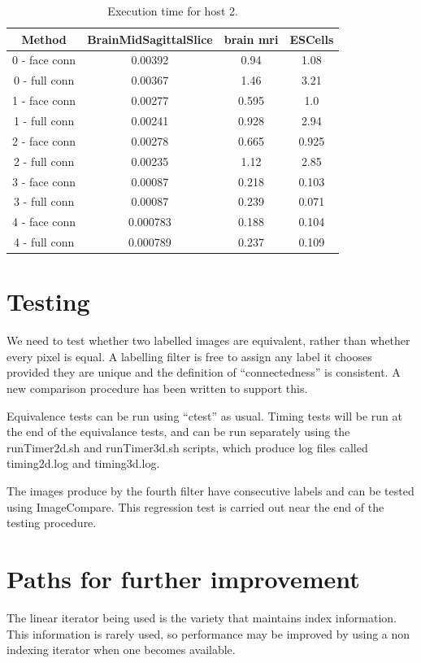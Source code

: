 \documentclass{InsightArticle}
\begin{document}
\begin{table}[htbp]
\centering
\begin{tabular}{|c|c|c|c|}
\hline
Method & BrainMidSagittalSlice & brain mri & ESCells \\
\hline
\hline
0 - face conn & 0.00392   & 0.94 & 1.08 \\
0 - full conn & 0.00367   & 1.46 & 3.21 \\
\hline
1 - face conn & 0.00277   & 0.595 & 1.0 \\
1 - full conn & 0.00241   & 0.928 & 2.94 \\
\hline
2 - face conn & 0.00278   & 0.665 & 0.925 \\
2 - full conn & 0.00235   & 1.12 & 2.85 \\
\hline
3 - face conn & 0.00087   & 0.218 & 0.103 \\
3 - full conn & 0.00087   & 0.239 & 0.071 \\
\hline
4 - face conn & 0.000783  & 0.188 & 0.104 \\
4 - full conn & 0.000789  & 0.237 & 0.109 \\

\end{tabular}
\caption{Execution time for host 2. \label{tbl:timing2}}
\end{table}

\section{Testing}
We need to test whether two labelled images are equivalent, rather
than whether every pixel is equal. A labelling filter is free to
assign any label it chooses provided they are unique and the
definition of ``connectedness'' is consistent. A new comparison
procedure has been written to support this.

Equivalence tests can be run using ``ctest'' as usual. Timing tests
will be run at the end of the equivalance tests, and can be run
separately using the runTimer2d.sh and runTimer3d.sh scripts, which
produce log files called timing2d.log and timing3d.log.

The images produce by the fourth filter have consecutive labels and
can be tested using ImageCompare. This regression test is carried out
near the end of the testing procedure.

\section{Paths for further improvement}
The linear iterator being used is the variety that maintains index
information. This information is rarely used, so performance may be
improved by using a non indexing iterator when one becomes available.
\end{document}
